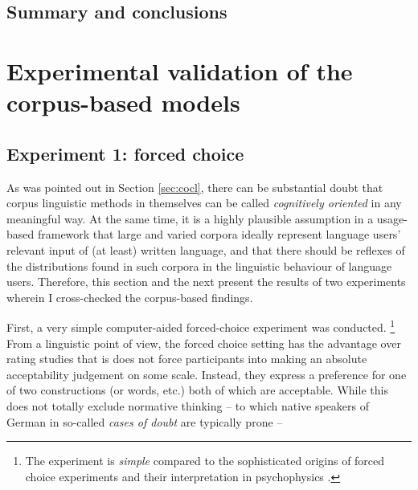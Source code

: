 \documentclass[USenglish]{article}
\begin{document}

\subsection{Summary and conclusions}
\label{sec:modelssummary}







\section{Experimental validation of the corpus-based models}
\label{sec:externalvalidation}

\subsection{Experiment 1: forced choice}

%

As was pointed out in Section \ref{sec:cocl}, there can be substantial doubt that corpus linguistic methods in themselves can be called \textit{cognitively oriented} in any meaningful way.
At the same time, it is a highly plausible assumption in a usage-based framework that large and varied corpora ideally represent language users' relevant input of (at least) written language, and that there should be reflexes of the distributions found in such corpora in the linguistic behaviour of language users.
Therefore, this section and the next present the results of two experiments wherein I cross-checked the corpus-based findings.

First, a very simple computer-aided forced-choice experiment was conducted.%
\footnote{The experiment is \textit{simple} compared to the sophisticated origins of forced choice experiments and their interpretation in psychophysics \citep[166--179]{MacmillanCreelman2005}.}
From a linguistic point of view, the forced choice setting has the advantage over rating studies that is does not force participants into making an absolute acceptability judgement on some scale.
Instead, they express a preference for one of two constructions (or words, etc.) both of which are acceptable.
While this does not totally exclude normative thinking -- to which native speakers of German in so-called \textit{cases of doubt} are typically prone -- 
\end{document}
